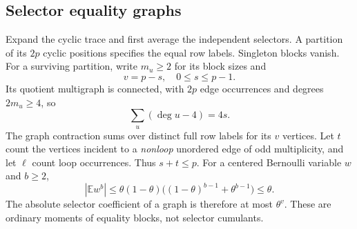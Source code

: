 \documentclass[11pt]{article}
\theoremstyle{definition}
\newcommand{\E}{\mathbb E}
\begin{document}
\subsection{Selector equality graphs}

Expand the cyclic trace and first average the independent selectors.
A partition of its \(2p\) cyclic positions specifies the equal row
labels. Singleton blocks vanish. For a surviving partition, write
\(m_u\ge2\) for its block sizes and
\[
 v=p-s,\quad 0\le s\le p-1.
\]
Its quotient multigraph is connected, with \(2p\) edge occurrences
and degrees \(2m_u\ge4\), so
\[
                         \sum_u(\deg u-4)=4s.                   \tag{11}
\]
The graph contraction sums over distinct full row labels for its
\(v\) vertices. Let \(t\) count the vertices incident to a
\emph{nonloop} unordered edge of odd multiplicity, and let \(\ell\)
count loop occurrences. Thus \(s+t\le p\).
For a centered Bernoulli variable \(w\) and \(b\ge2\),
\[
 |\E w^b|
 \le\theta(1-\theta)\big((1-\theta)^{b-1}+\theta^{b-1}\big)
 \le\theta.                                                     \tag{12}
\]
The absolute selector coefficient of a graph is therefore at most
\(\theta^v\). These are ordinary moments of equality blocks, not
selector cumulants.
\end{document}
